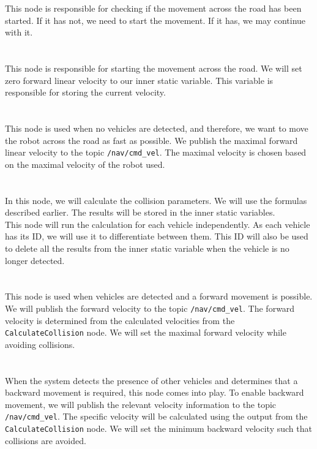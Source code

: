         This node is responsible for checking if the movement across the road has been started. If it has not, we need to start the movement. If it has, we may continue with it.\\\\
    \\
        This node is responsible for starting the movement across the road. We will set zero forward linear velocity to our inner static variable. This variable is responsible for storing the current velocity.\\\\
    \\
        This node is used when no vehicles are detected, and therefore, we want to move the robot across the road as fast as possible. We publish the maximal forward linear velocity to the topic \texttt{/nav/cmd\_vel}. The maximal velocity is chosen based on the maximal velocity of the robot used.\\\\
    \\
        In this node, we will calculate the collision parameters. We will use the formulas described earlier. The results will be stored in the inner static variables.\\
        This node will run the calculation for each vehicle independently. As each vehicle has its ID, we will use it to differentiate between them. This ID will also be used to delete all the results from the inner static variable when the vehicle is no longer detected.\\\\
    \\
        This node is used when vehicles are detected and a forward movement is possible. We will publish the forward velocity to the topic \texttt{/nav/cmd\_vel}. The forward velocity is determined from the calculated velocities from the \texttt{CalculateCollision} node. We will set the maximal forward velocity while avoiding collisions.\\\\
    \\
        When the system detects the presence of other vehicles and determines that a backward movement is required, this node comes into play. To enable backward movement, we will publish the relevant velocity information to the topic \texttt{/nav/cmd\_vel}. The specific velocity will be calculated using the output from the \texttt{CalculateCollision} node. We will set the minimum backward velocity such that collisions are avoided.\\\\
